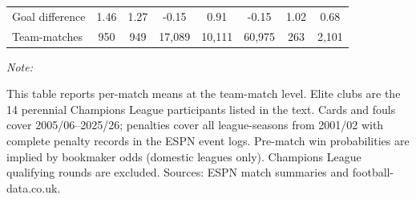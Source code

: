\begin{table}[!h]
{\begin{threeparttable}
\begin{tabular}[t]{lccccccc}
Goal difference & 1.46 & 1.27 & -0.15 & 0.91 & -0.15 & 1.02 & 0.68\\
Team-matches & 950 & 949 & 17,089 & 10,111 & 60,975 & 263 & 2,101\\
\bottomrule
\end{tabular}
\begin{tablenotes}[para]
\item \textit{Note: } 
\item This table reports per-match means at the team-match level. Elite clubs are the 14 perennial Champions League participants listed in the text. Cards and fouls cover 2005/06--2025/26; penalties cover all league-seasons from 2001/02 with complete penalty records in the ESPN event logs. Pre-match win probabilities are implied by bookmaker odds (domestic leagues only). Champions League qualifying rounds are excluded. Sources: ESPN match summaries and football-data.co.uk.
\end{tablenotes}
\end{threeparttable}}
\end{table}

